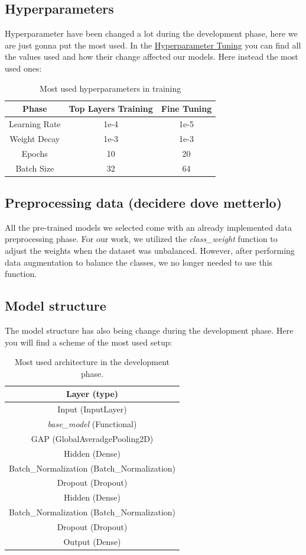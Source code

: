 \documentclass[11pt]{article}
\begin{document}
\subsection{Hyperparameters}
Hyperparameter have been changed a lot during the development phase, here we are just gonna put the most used. In the \hyperref[hyperparametertuning]{Hyperparameter Tuning} you can find all the values used and how their change affected our models.
Here instead the most used ones:\\
\begin{table}[h!]
\centering
\begin{tabular}{|c|c|c|}
\hline
\textbf{Phase} & \textbf{Top Layers Training} & \textbf{Fine Tuning} \\ \hline
Learning Rate & 1e-4 & 1e-5 \\ \hline
Weight Decay & 1e-3 & 1e-3 \\ \hline
Epochs & 10 & 20 \\ \hline
Batch Size & 32 & 64 \\ \hline
\end{tabular}
\caption{Most used hyperparameters in training}
\end{table}
\subsection{Preprocessing data (decidere dove metterlo)}
All the pre-trained models we selected come with an already implemented data preprocessing phase. For our work, we utilized the \textit{class\_weight} function to adjust the weights when the dataset was unbalanced. However, after performing data augmentation to balance the classes, we no longer needed to use this function.
\subsection{Model structure}
The model structure has also being change during the development phase.
Here you will find a scheme of the most used setup:
\begin{table}[h!]
\centering
\begin{tabular}{|c|}
\hline
\textbf{Layer (type)} \\ \hline
Input (InputLayer)\\ \hline
\textit{base\_model} (Functional)\\ \hline
GAP (GlobalAveradgePooling2D)\\ \hline
Hidden (Dense)\\ \hline
Batch\_Normalization (Batch\_Normalization)\\ \hline
Dropout (Dropout)\\ \hline
Hidden (Dense)\\ \hline
Batch\_Normalization (Batch\_Normalization)\\ \hline
Dropout (Dropout)\\ \hline
Output (Dense)\\ \hline
\end{tabular}

\caption{Most used architecture in the development phase.}
\end{table}
\end{document}
